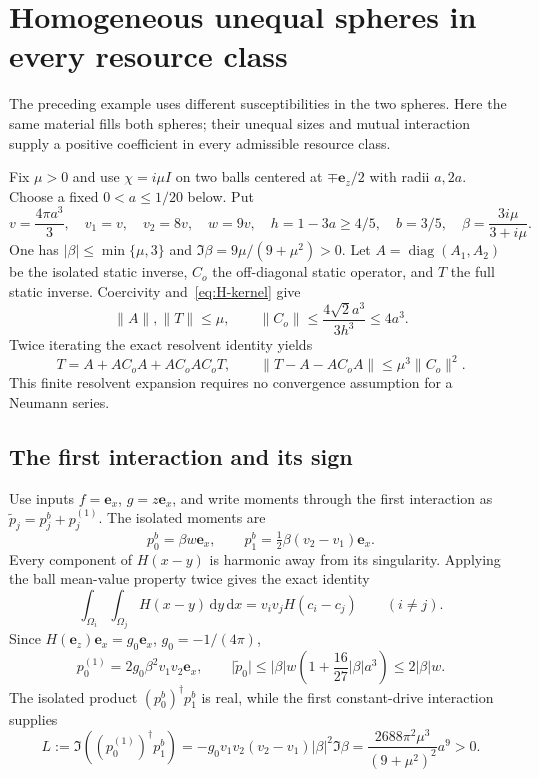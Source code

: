 \documentclass[11pt]{article}
\newcommand{\dd}{\,\mathrm{d}}
\newcommand{\norm}[1]{\lVert #1\rVert}
\newcommand{\abs}[1]{\lvert #1\rvert}
\newcommand{\ex}{\mathbf e_x}
\newcommand{\ez}{\mathbf e_z}
\begin{document}
\section{Homogeneous unequal spheres in every resource class}\label{sec:homogeneous}
The preceding example uses different susceptibilities in the two spheres. Here the same material fills both spheres; their unequal sizes and mutual interaction supply a positive coefficient in every admissible resource class.

Fix $\mu>0$ and use $\chi=i\mu I$ on two balls centered at $\mp\ez/2$ with radii $a,2a$. Choose a fixed $0<a\leq1/20$ below. Put
\begin{equation}\label{eq:homogeneous-parameters}
 v=\frac{4\pi a^3}{3},\quad v_1=v,\quad v_2=8v,\quad
 w=9v,\quad h=1-3a\geq4/5,\quad b=3/5,\quad
 \beta=\frac{3i\mu}{3+i\mu}.
\end{equation}
One has $\abs\beta\leq\min\{\mu,3\}$ and $\Im\beta=9\mu/(9+\mu^2)>0$. Let $A=\operatorname{diag}(A_1,A_2)$ be the isolated static inverse, $C_o$ the off-diagonal static operator, and $T$ the full static inverse. Coercivity and~\eqref{eq:H-kernel} give
\begin{equation}\label{eq:homogeneous-resolvent}
 \norm A,\norm T\leq\mu,\qquad
 \norm{C_o}\leq\frac{4\sqrt2a^3}{3h^3}\leq4a^3.
\end{equation}
Twice iterating the exact resolvent identity yields
\begin{equation}\label{eq:second-order}
 T=A+AC_oA+AC_oAC_oT,\qquad
 \norm{T-A-AC_oA}\leq\mu^3\norm{C_o}^2.
\end{equation}
This finite resolvent expansion requires no convergence assumption for a Neumann series.

\subsection{The first interaction and its sign}
Use inputs $f=\ex$, $g=z\ex$, and write moments through the first interaction as $\widetilde p_j=p_j^b+p_j^{(1)}$. The isolated moments are
\[
 p_0^b=\beta w\ex,\qquad
 p_1^b=\tfrac12\beta(v_2-v_1)\ex.
\]
Every component of $H(x-y)$ is harmonic away from its singularity. Applying the ball mean-value property twice gives the exact identity
\begin{equation}\label{eq:mean-value}
 \int_{\Omega_i}\int_{\Omega_j}H(x-y)\dd y\dd x
 =v_iv_jH(c_i-c_j)\qquad(i\ne j).
\end{equation}
Since $H(\ez)\ex=g_0\ex$, $g_0=-1/(4\pi)$,
\begin{equation}\label{eq:p0-correction}
 p_0^{(1)}=2g_0\beta^2v_1v_2\ex,\qquad
 \abs{\widetilde p_0}\leq\abs\beta w
 \left(1+\frac{16}{27}\abs\beta a^3\right)\leq2\abs\beta w.
\end{equation}
The isolated product $(p_0^b)^\dagger p_1^b$ is real, while the first constant-drive interaction supplies
\begin{equation}\label{eq:L}
 L:=\Im((p_0^{(1)})^\dagger p_1^b)
 =-g_0v_1v_2(v_2-v_1)\abs\beta^2\Im\beta
 =\frac{2688\pi^2\mu^3}{(9+\mu^2)^2}a^9>0.
\end{equation}
\end{document}
